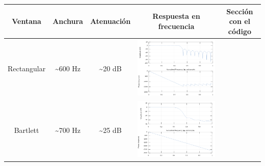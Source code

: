 \documentclass[11pt,a4paper]{article}
\begin{document}
\begin{table}[H]
\begin{tabular}{|c|c|c|c|c|}
\hline
Ventana  & Anchura & Atenuación & Respuesta en frecuencia & Sección con el código \\ \hline
Rectangular & \textasciitilde{}600 Hz            & \textasciitilde{}20 dB                       & \includegraphics[scale=0.25]{img/6.png} &  \color{deepred}\nameref{code5}\color{black} \\ \hline
Bartlett & \textasciitilde{}700 Hz            & \textasciitilde{}25 dB                       & \includegraphics[scale=0.25]{img/7.png} & \color{deepred}\nameref{code6}\color{black} \\ \hline

\end{tabular}
\end{table}
\end{document}
